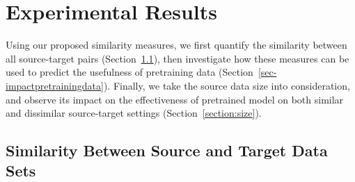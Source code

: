 \documentclass[11pt,a4paper]{article}
\begin{document}
\section{Experimental Results}
Using our proposed similarity measures, we first quantify the similarity between all source-target pairs (Section~\ref{section:similarity_results}), then investigate how these measures can be used to predict the usefulness of pretraining data (Section~\ref{sec-impactpretrainingdata}). Finally, we take the source data size into consideration, and observe its impact on the effectiveness of pretrained model on both similar and dissimilar source-target settings (Section~\ref{section:size}).

\subsection{Similarity Between Source and Target Data Sets}
\label{section:similarity_results}
\end{document}
